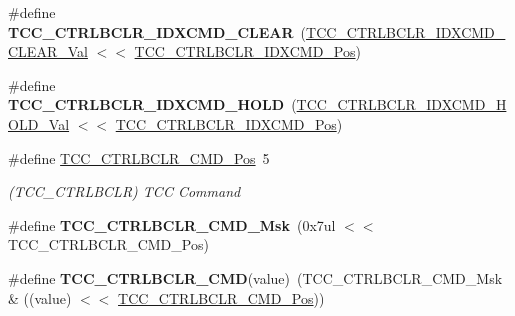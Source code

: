 \begin{DoxyCompactItemize}
\item 
\hypertarget{group___s_a_m_l21___t_c_c_ga954b838c2ed4cc3fbcf939f106b0d4b1}{}\#define {\bfseries T\+C\+C\+\_\+\+C\+T\+R\+L\+B\+C\+L\+R\+\_\+\+I\+D\+X\+C\+M\+D\+\_\+\+C\+L\+E\+A\+R}~(\hyperlink{group___s_a_m_l21___t_c_c_ga330fda675ed566f5e7ccca52c33df413}{T\+C\+C\+\_\+\+C\+T\+R\+L\+B\+C\+L\+R\+\_\+\+I\+D\+X\+C\+M\+D\+\_\+\+C\+L\+E\+A\+R\+\_\+\+Val} $<$$<$ \hyperlink{group___s_a_m_l21___t_c_c_gabddca25dc97286079867b1f3714bb494}{T\+C\+C\+\_\+\+C\+T\+R\+L\+B\+C\+L\+R\+\_\+\+I\+D\+X\+C\+M\+D\+\_\+\+Pos})\label{group___s_a_m_l21___t_c_c_ga954b838c2ed4cc3fbcf939f106b0d4b1}

\item 
\hypertarget{group___s_a_m_l21___t_c_c_ga2c24dd34dbfe7a1345e4fad5aec7cd13}{}\#define {\bfseries T\+C\+C\+\_\+\+C\+T\+R\+L\+B\+C\+L\+R\+\_\+\+I\+D\+X\+C\+M\+D\+\_\+\+H\+O\+L\+D}~(\hyperlink{group___s_a_m_l21___t_c_c_gad32be7d01dd69980f7da94c6353064f9}{T\+C\+C\+\_\+\+C\+T\+R\+L\+B\+C\+L\+R\+\_\+\+I\+D\+X\+C\+M\+D\+\_\+\+H\+O\+L\+D\+\_\+\+Val}  $<$$<$ \hyperlink{group___s_a_m_l21___t_c_c_gabddca25dc97286079867b1f3714bb494}{T\+C\+C\+\_\+\+C\+T\+R\+L\+B\+C\+L\+R\+\_\+\+I\+D\+X\+C\+M\+D\+\_\+\+Pos})\label{group___s_a_m_l21___t_c_c_ga2c24dd34dbfe7a1345e4fad5aec7cd13}

\item 
\hypertarget{group___s_a_m_l21___t_c_c_gadd633ac48572abb4f937fcbf892ef5e3}{}\#define \hyperlink{group___s_a_m_l21___t_c_c_gadd633ac48572abb4f937fcbf892ef5e3}{T\+C\+C\+\_\+\+C\+T\+R\+L\+B\+C\+L\+R\+\_\+\+C\+M\+D\+\_\+\+Pos}~5\label{group___s_a_m_l21___t_c_c_gadd633ac48572abb4f937fcbf892ef5e3}

\begin{DoxyCompactList}\small\item\em (T\+C\+C\+\_\+\+C\+T\+R\+L\+B\+C\+L\+R) T\+C\+C Command \end{DoxyCompactList}\item 
\hypertarget{group___s_a_m_l21___t_c_c_ga61e11ec4ef39efa9e728d5db4617f24f}{}\#define {\bfseries T\+C\+C\+\_\+\+C\+T\+R\+L\+B\+C\+L\+R\+\_\+\+C\+M\+D\+\_\+\+Msk}~(0x7ul $<$$<$ T\+C\+C\+\_\+\+C\+T\+R\+L\+B\+C\+L\+R\+\_\+\+C\+M\+D\+\_\+\+Pos)\label{group___s_a_m_l21___t_c_c_ga61e11ec4ef39efa9e728d5db4617f24f}

\item 
\hypertarget{group___s_a_m_l21___t_c_c_gaae6e9ba79f659c452d0ad27a805d5985}{}\#define {\bfseries T\+C\+C\+\_\+\+C\+T\+R\+L\+B\+C\+L\+R\+\_\+\+C\+M\+D}(value)~(T\+C\+C\+\_\+\+C\+T\+R\+L\+B\+C\+L\+R\+\_\+\+C\+M\+D\+\_\+\+Msk \& ((value) $<$$<$ \hyperlink{group___s_a_m_l21___t_c_c_gadd633ac48572abb4f937fcbf892ef5e3}{T\+C\+C\+\_\+\+C\+T\+R\+L\+B\+C\+L\+R\+\_\+\+C\+M\+D\+\_\+\+Pos}))\label{group___s_a_m_l21___t_c_c_gaae6e9ba79f659c452d0ad27a805d5985}


\end{DoxyCompactItemize}
